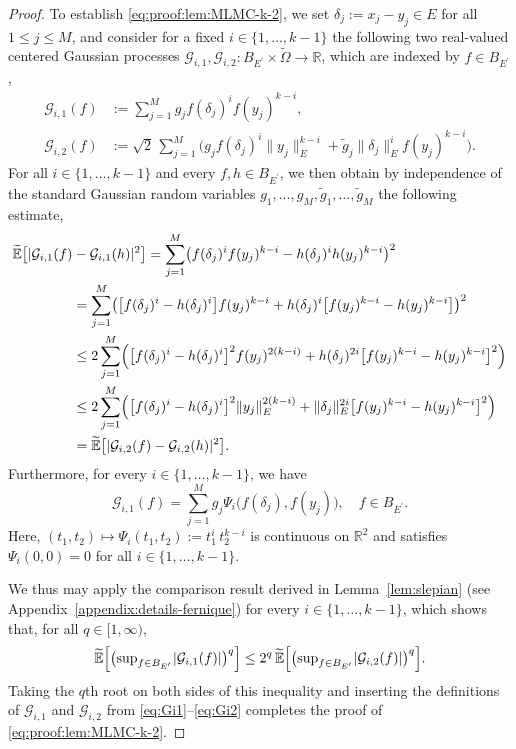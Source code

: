 \documentclass[reqno]{amsart}
\numberwithin{equation}{section}
\newcommand{\bbE}{\mathbb{E}}
\newcommand{\bbR}{\mathbb{R}}
\newcommand{\cG}{\mathcal{G}}
\newcommand{\Omegat}{\widetilde{\Omega}}
\newcommand{\bbEt}{\widetilde{\bbE}}
\newcommand{\norm}[2]{     \| #1       \|_{ #2 }}
\newcommand{\dual}[1]{{#1}^{\prime}}
\newcommand{\from}{\colon}
\theoremstyle{remark}
\theoremstyle{definition}
\begin{document}
\begin{proof}
	To establish \eqref{eq:proof:lem:MLMC-k-2}, 
	we set $\delta_j := x_j - y_j\in E$ for all $1\leq j \leq M$, and 
	consider for a fixed $i\in\{1,\dots,k-1\}$ the following two real-valued 
	centered Gaussian processes 
	$\cG_{i,1}, \cG_{i,2} \from B_{\dual{E}}\! \times \Omegat \to \bbR$, 
	which are 
	indexed by $f\in B_{\dual{E}}$, 
	\begin{align} 
	\cG_{i,1}(f)
	&:= 
	\sum_{j=1}^M 
	g_j 
	f( \delta_j )^i f( y_j )^{k-i} , 
	\label{eq:Gi1}
	\\
	\cG_{i,2}(f)
	&:= 
	\sqrt{2} \, 
	\sum_{j=1}^M 
	\bigl( 
	g_j 
	f( \delta_j )^i \norm{ y_j }{E}^{k-i}  
	+ 
	\widetilde{g}_j 
	\norm{ \delta_j }{E}^i f( y_j )^{k-i}   
	\bigr). 
	\label{eq:Gi2} 
	\end{align} 
	For all $i\in\{1,\dots,k-1\}$ and 
	every $f,h\in B_{\dual{E}}$, 
	we then obtain by independence of the 
	standard Gaussian random variables 
	$g_1, \ldots, g_M, \widetilde{g}_1, \ldots, \widetilde{g}_M$ 
	the following estimate,  
	\begin{align*} 
	\bbEt \bigl[ |\cG_{i,1}(f) &- \cG_{i,1}(h)|^2 \bigr] 
	=  
	\sum_{j=1}^M 
	\bigl( f( \delta_j )^i f( y_j )^{k-i}   
	- 
	h( \delta_j )^i h( y_j )^{k-i} \bigr)^2 
	\\
	&= 
	\sum_{j=1}^M 
	\bigl( \bigl[ f( \delta_j )^i - h( \delta_j )^i \bigr] f( y_j )^{k-i}   
	+ 
	h( \delta_j )^i \bigl[ f( y_j )^{k-i} - h( y_j )^{k-i} \bigr] \bigr)^2 
	\\
	&\leq 
	2
	\sum_{j=1}^M 
	\Bigl( 
	\bigl[ f( \delta_j )^i - h( \delta_j )^i \bigr]^2 f( y_j )^{2(k-i)}   
	+ 
	h( \delta_j )^{2i} \bigl[ f( y_j )^{k-i} - h( y_j )^{k-i}\bigr]^2 
	\Bigr) 
	\\
	&\leq 
	2
	\sum_{j=1}^M 
	\Bigl( 
	\bigl[ f( \delta_j )^i - h( \delta_j )^i \bigr]^2 \norm{ y_j }{E}^{2(k-i)}   
	+ 
	\norm{ \delta_j }{E}^{2i} \bigl[ f( y_j )^{k-i} - h( y_j )^{k-i} \bigr]^2 
	\Bigr) 
	\\
	&= 
	\bbEt\bigl[ | \cG_{i,2}(f) - \cG_{i,2}(h) |^2 \bigr]. 
	\end{align*} 
	Furthermore, for every $i\in\{1,\dots,k-1\}$, 
	we have 
	\[
	\cG_{i,1}(f) 
	= 
	\sum_{j=1}^M g_j \Psi_i \bigl( f(\delta_j), f(y_j) \bigr), 
	\quad 
	f\in B_{\dual{E}\!}. 
	\]
	Here, $(t_1,t_2)\mapsto \Psi_i(t_1,t_2) := t_1^i \, t_2^{k-i}$ 
	is continuous on $\bbR^2$ 
	and satisfies $\Psi_i(0,0) = 0$ 
	for all $i\in\{1,\dots,k-1\}$. 
	
	We thus may apply the comparison result 
	derived in Lemma~\ref{lem:slepian} 
	(see Appendix~\ref{appendix:details-fernique}) 
	for every ${i\in\{1,\ldots,k-1\}}$, 
	which shows that, 
	for all $q\in[1,\infty)$, 
	\begin{align*} 
	\bbEt\Bigl[
	\bigl(  
	\sup\nolimits_{f \in B_{\dual{E}} \!} 
	|\cG_{i,1}(f)| \bigr)^q 
	\Bigr] 
	\leq 
	2^q \, 
	\bbEt\Bigl[ 
	\bigl( \sup\nolimits_{f \in B_{\dual{E}} \!} 
	|\cG_{i,2}(f) | \bigr)^q \Bigr] . 
	\end{align*} 
	Taking the $q$th root 
	on both sides of this inequality 
	and inserting the definitions 
	of $\cG_{i,1}$ and $\cG_{i,2}$ 
	from \eqref{eq:Gi1}--\eqref{eq:Gi2} 
	completes the proof 
	of \eqref{eq:proof:lem:MLMC-k-2}. 
	

\end{proof}
\end{document}
